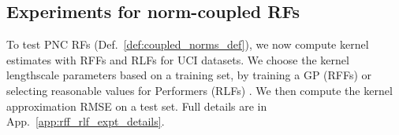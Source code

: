 \vspace{-2mm}
\subsection{Experiments for norm-coupled RFs} \label{sec:rff_rlf_exps}



To test PNC RFs (Def.~\ref{def:coupled_norms_def}), we now compute kernel estimates with RFFs and RLFs for UCI datasets. 
We choose the kernel lengthscale parameters based on a training set, by training a GP (RFFs) or selecting reasonable values for Performers (RLFs) \citep{choromanski2020rethinking}.
We then compute the kernel approximation RMSE on a test set.
Full details are in App.~\ref{app:rff_rlf_expt_details}.

